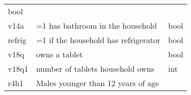 \documentclass[11pt]{article}
\begin{document}
\begin{longtable}[]{@{}lll@{}}
\begin{minipage}[t]{0.24\columnwidth}
bool\strut
\end{minipage}\tabularnewline
\begin{minipage}[t]{0.19\columnwidth}\raggedright\strut
v14a\strut
\end{minipage} & \begin{minipage}[t]{0.16\columnwidth}\raggedright\strut
=1 has bathroom in the household\strut
\end{minipage} & \begin{minipage}[t]{0.24\columnwidth}\raggedright\strut
bool\strut
\end{minipage}\tabularnewline
\begin{minipage}[t]{0.19\columnwidth}\raggedright\strut
refrig\strut
\end{minipage} & \begin{minipage}[t]{0.16\columnwidth}\raggedright\strut
=1 if the household has refrigerator\strut
\end{minipage} & \begin{minipage}[t]{0.24\columnwidth}\raggedright\strut
bool\strut
\end{minipage}\tabularnewline
\begin{minipage}[t]{0.19\columnwidth}\raggedright\strut
v18q\strut
\end{minipage} & \begin{minipage}[t]{0.16\columnwidth}\raggedright\strut
owns a tablet\strut
\end{minipage} & \begin{minipage}[t]{0.24\columnwidth}\raggedright\strut
bool\strut
\end{minipage}\tabularnewline
\begin{minipage}[t]{0.19\columnwidth}\raggedright\strut
v18q1\strut
\end{minipage} & \begin{minipage}[t]{0.16\columnwidth}\raggedright\strut
number of tablets household owns\strut
\end{minipage} & \begin{minipage}[t]{0.24\columnwidth}\raggedright\strut
int\strut
\end{minipage}\tabularnewline
\begin{minipage}[t]{0.19\columnwidth}\raggedright\strut
r4h1\strut
\end{minipage} & \begin{minipage}[t]{0.16\columnwidth}\raggedright\strut
Males younger than 12 years of age\strut
\end{minipage} & \begin{minipage}[t]{0.24\columnwidth}\raggedright\strut

\end{minipage}
\end{longtable}
\end{document}
